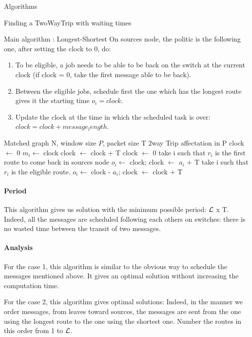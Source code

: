 \documentclass[a4paper,10pt]{report}
\begin{document}
\begin{chapter}{Algorithms}
\begin{section}{Finding a TwoWayTrip with waiting times}
\begin{subsection}{Main algorithm : Longest-Shortest}
On sources node, the politic is the following one, after setting the clock to 0, do:
\begin{enumerate}
 \item To be eligible, a job needs to be able to be back on the switch at the current clock (if clock = 0, take the first message able to be back).
 \item Between the eligible jobs, schedule first the one which has the longest route gives it the starting time $o_i = clock$.
 \item Update the clock at the time in which the scheduled task is over: $clock = clock + message_length$.
\end{enumerate}

\begin{algorithm}[H]
\caption{Longest shortest with waiting times}
\begin{algorithmic}
\REQUIRE Matched graph N, window size $P$, packet size T
\ENSURE 2way Trip affectation in P
\STATE clock $\leftarrow$ 0
\STATE  $m_i \leftarrow$ clock
\STATE clock $\leftarrow$ clock + T
\ENDFOR
\STATE clock $\leftarrow$ 0
\STATE take i such that $r_i$ is the first route to come back in sources node
\STATE $o_i \leftarrow $ clock;
\STATE clock $\leftarrow$ $a_i$ + T
\STATE take i such that $r_i$ is the eligible route.
\STATE $o_i \leftarrow $ clock - $a_i$;
\STATE clock $\leftarrow$ clock + T

\ENDWHILE

\end{algorithmic}
\end{algorithm}


\paragraph{Period}
This algorithm gives us solution with the minimum possible period: ${\cal L}$ x T. Indeed, all the messages are scheduled following each others on switches:
there is no wasted time between the transit of two messages.

\paragraph{Analysis}
For the case 1, this algorithm is similar to the obvious way to schedule the messages mentioned above. It gives an optimal solution without increasing 
the computation time.

For the case 2, this algorithm gives optimal solutions: Indeed, in the manner we order messages, from leaves toward sources,
the messages are sent from the one using the longest route to the one using the shortest one. Number the routes in this order from 1 to ${\cal L}$.


\end{subsection}
\end{section}
\end{chapter}
\end{document}
